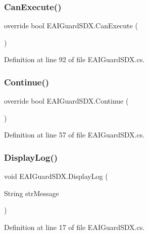 \subsubsection{\texorpdfstring{CanExecute()}{CanExecute()}}
{\footnotesize\ttfamily override bool E\+A\+I\+Guard\+S\+D\+X.\+Can\+Execute (\begin{DoxyParamCaption}{ }\end{DoxyParamCaption})}



Definition at line 92 of file E\+A\+I\+Guard\+S\+D\+X.\+cs.

\mbox{\label{class_e_a_i_guard_s_d_x_afd38634fac3d0e5904071101bd261b32}} 
\subsubsection{\texorpdfstring{Continue()}{Continue()}}
{\footnotesize\ttfamily override bool E\+A\+I\+Guard\+S\+D\+X.\+Continue (\begin{DoxyParamCaption}{ }\end{DoxyParamCaption})}



Definition at line 57 of file E\+A\+I\+Guard\+S\+D\+X.\+cs.

\mbox{\label{class_e_a_i_guard_s_d_x_ac0341198cb9c52a5426046c398db7105}} 
\subsubsection{\texorpdfstring{DisplayLog()}{DisplayLog()}}
{\footnotesize\ttfamily void E\+A\+I\+Guard\+S\+D\+X.\+Display\+Log (\begin{DoxyParamCaption}\item[{String}]{str\+Message }\end{DoxyParamCaption})}



Definition at line 17 of file E\+A\+I\+Guard\+S\+D\+X.\+cs.

\mbox{\label{class_e_a_i_guard_s_d_x_af2404340be7f99173c0f5cdbb4ee2fcc}} 
